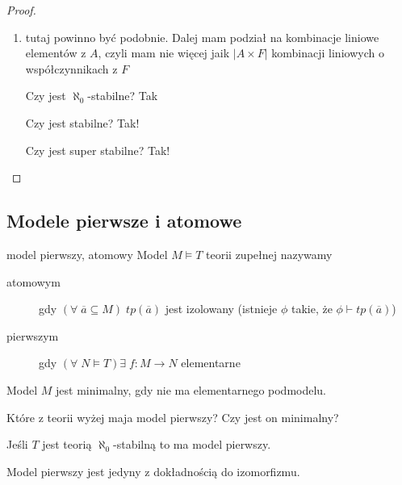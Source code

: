 \begin{proof}
\begin{enumerate}
      Czy jest stabilne? No jasne

      Czy jest superstabilne? Tak! Wystarczy $\mu=\aleph_0$.
      
    \item tutaj powinno być podobnie. Dalej mam podział na kombinacje liniowe elementów z $A$, czyli mam nie więcej jaik $|A\times F|$ kombinacji liniowych o współczynnikach z $F$

      Czy jest $\aleph_0$-stabilne? Tak

      Czy jest stabilne? Tak!

      Czy jest super stabilne? Tak!
  \end{enumerate}
\end{proof}

\subsection{Modele pierwsze i atomowe}

\begin{definition}{model pierwszy, atomowy}{}
  Model $M\models T$ teorii zupełnej nazywamy
  \begin{description}
    \item[atomowym] gdy $(\forall\;\overline{a}\subseteq M)\;tp(\overline{a})$ jest izolowany (istnieje $\phi$ takie, że $\phi\vdash tp(\overline{a})$)
    \item[pierwszym] gdy $(\forall\;N\models T)\exists\;f:M\to N$ elementarne
  \end{description}
\end{definition}

Model $M$ jest minimalny, gdy nie ma elementarnego podmodelu.

\begin{zadanie}
  Które z teorii wyżej maja model pierwszy? Czy jest on minimalny?
\end{zadanie}

\begin{theorem}{}{}
  Jeśli $T$ jest teorią $\aleph_0$-stabilną to ma model pierwszy.
\end{theorem}

\begin{theorem}{}{}
  Model pierwszy jest jedyny z dokładnością do izomorfizmu.
\end{theorem}

